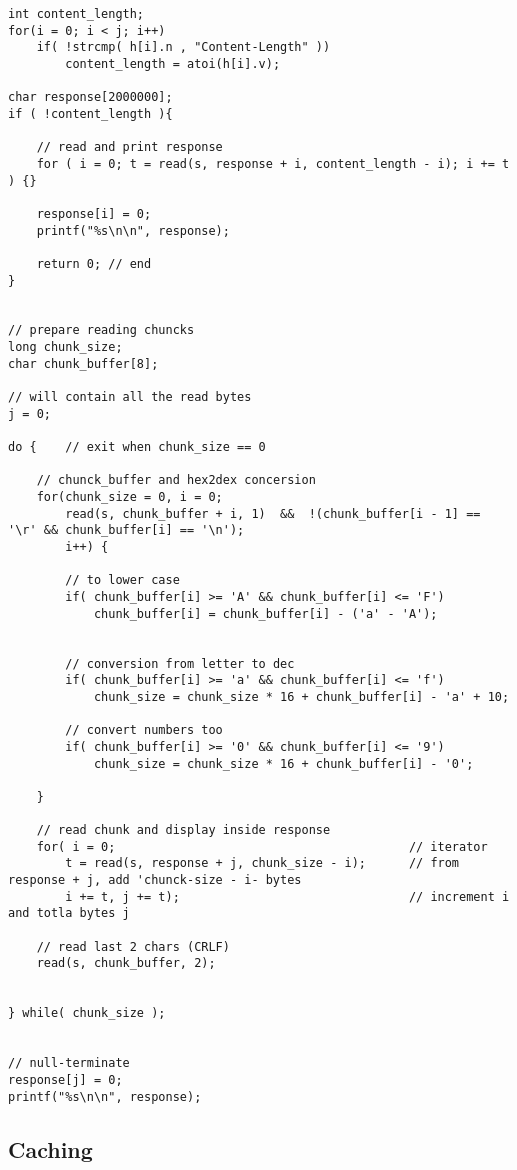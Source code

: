 \begin{lstlisting}
int content_length;
for(i = 0; i < j; i++)
    if( !strcmp( h[i].n , "Content-Length" ))
        content_length = atoi(h[i].v);

char response[2000000];          
if ( !content_length ){

    // read and print response
    for ( i = 0; t = read(s, response + i, content_length - i); i += t ) {}

    response[i] = 0;
    printf("%s\n\n", response);

    return 0; // end
}
    

// prepare reading chuncks
long chunk_size;
char chunk_buffer[8];

// will contain all the read bytes
j = 0;

do {    // exit when chunk_size == 0

    // chunck_buffer and hex2dex concersion
    for(chunk_size = 0, i = 0;
        read(s, chunk_buffer + i, 1)  &&  !(chunk_buffer[i - 1] == '\r' && chunk_buffer[i] == '\n');
        i++) {
        
        // to lower case
        if( chunk_buffer[i] >= 'A' && chunk_buffer[i] <= 'F')
            chunk_buffer[i] = chunk_buffer[i] - ('a' - 'A');

        
        // conversion from letter to dec
        if( chunk_buffer[i] >= 'a' && chunk_buffer[i] <= 'f')
            chunk_size = chunk_size * 16 + chunk_buffer[i] - 'a' + 10;
        
        // convert numbers too
        if( chunk_buffer[i] >= '0' && chunk_buffer[i] <= '9')
            chunk_size = chunk_size * 16 + chunk_buffer[i] - '0';
    
    }

    // read chunk and display inside response
    for( i = 0;                                         // iterator
        t = read(s, response + j, chunk_size - i);      // from response + j, add 'chunck-size - i- bytes
        i += t, j += t);                                // increment i and totla bytes j

    // read last 2 chars (CRLF)
    read(s, chunk_buffer, 2);


} while( chunk_size );


// null-terminate
response[j] = 0;
printf("%s\n\n", response);
\end{lstlisting}

\newpage\subsection{Caching}

